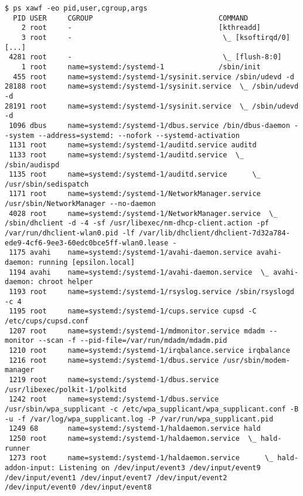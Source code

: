 \documentclass[10pt,oneside,a4paper]{article}
\begin{document}
\begin{landscape}
\begin{Verbatim}[fontsize=\small]
$ ps xawf -eo pid,user,cgroup,args
  PID USER     CGROUP                              COMMAND
    2 root     -                                   [kthreadd]
    3 root     -                                    \_ [ksoftirqd/0]
[...]
 4281 root     -                                    \_ [flush-8:0]
    1 root     name=systemd:/systemd-1             /sbin/init
  455 root     name=systemd:/systemd-1/sysinit.service /sbin/udevd -d
28188 root     name=systemd:/systemd-1/sysinit.service  \_ /sbin/udevd -d
28191 root     name=systemd:/systemd-1/sysinit.service  \_ /sbin/udevd -d
 1096 dbus     name=systemd:/systemd-1/dbus.service /bin/dbus-daemon --system --address=systemd: --nofork --systemd-activation
 1131 root     name=systemd:/systemd-1/auditd.service auditd
 1133 root     name=systemd:/systemd-1/auditd.service  \_ /sbin/audispd
 1135 root     name=systemd:/systemd-1/auditd.service      \_ /usr/sbin/sedispatch
 1171 root     name=systemd:/systemd-1/NetworkManager.service /usr/sbin/NetworkManager --no-daemon
 4028 root     name=systemd:/systemd-1/NetworkManager.service  \_ /sbin/dhclient -d -4 -sf /usr/libexec/nm-dhcp-client.action -pf /var/run/dhclient-wlan0.pid -lf /var/lib/dhclient/dhclient-7d32a784-ede9-4cf6-9ee3-60edc0bce5ff-wlan0.lease -
 1175 avahi    name=systemd:/systemd-1/avahi-daemon.service avahi-daemon: running [epsilon.local]
 1194 avahi    name=systemd:/systemd-1/avahi-daemon.service  \_ avahi-daemon: chroot helper
 1193 root     name=systemd:/systemd-1/rsyslog.service /sbin/rsyslogd -c 4
 1195 root     name=systemd:/systemd-1/cups.service cupsd -C /etc/cups/cupsd.conf
 1207 root     name=systemd:/systemd-1/mdmonitor.service mdadm --monitor --scan -f --pid-file=/var/run/mdadm/mdadm.pid
 1210 root     name=systemd:/systemd-1/irqbalance.service irqbalance
 1216 root     name=systemd:/systemd-1/dbus.service /usr/sbin/modem-manager
 1219 root     name=systemd:/systemd-1/dbus.service /usr/libexec/polkit-1/polkitd
 1242 root     name=systemd:/systemd-1/dbus.service /usr/sbin/wpa_supplicant -c /etc/wpa_supplicant/wpa_supplicant.conf -B -u -f /var/log/wpa_supplicant.log -P /var/run/wpa_supplicant.pid
 1249 68       name=systemd:/systemd-1/haldaemon.service hald
 1250 root     name=systemd:/systemd-1/haldaemon.service  \_ hald-runner
 1273 root     name=systemd:/systemd-1/haldaemon.service      \_ hald-addon-input: Listening on /dev/input/event3 /dev/input/event9 /dev/input/event1 /dev/input/event7 /dev/input/event2 /dev/input/event0 /dev/input/event8

\end{Verbatim}
\end{landscape}
\end{document}
